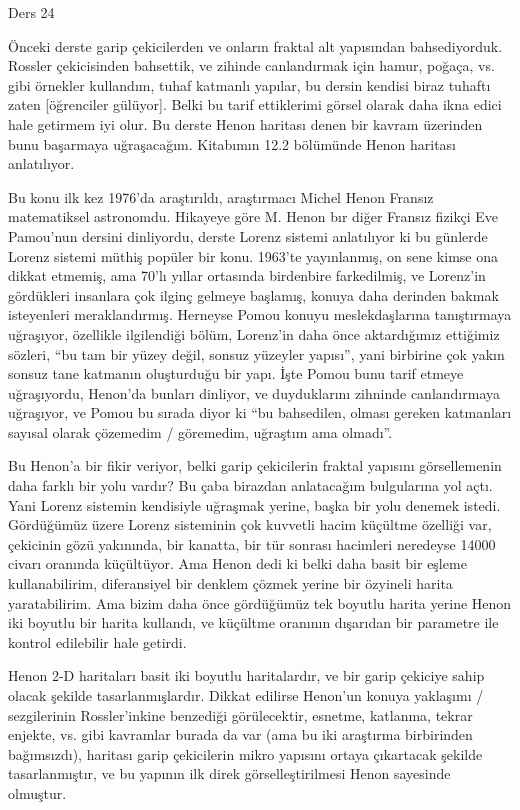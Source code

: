 \documentclass[12pt,fleqn]{article}\usepackage{../../common}
\begin{document}
Ders 24

Önceki derste garip çekicilerden ve onların fraktal alt yapısından
bahsediyorduk. Rossler çekicisinden bahsettik, ve zihinde canlandırmak için
hamur, poğaça, vs. gibi örnekler kullandım, tuhaf katmanlı yapılar, bu
dersin kendisi biraz tuhaftı zaten [öğrenciler gülüyor]. Belki bu tarif
ettiklerimi görsel olarak daha ikna edici hale getirmem iyi olur. Bu derste
Henon haritası denen bir kavram üzerinden bunu başarmaya
uğraşacağım. Kitabımın 12.2 bölümünde Henon haritası anlatılıyor.

Bu konu ilk kez 1976'da araştırıldı, araştırmacı Michel Henon Fransız
matematiksel astronomdu. Hikayeye göre M. Henon bır diğer Fransız fizikçi
Eve Pamou'nun dersini dinliyordu, derste Lorenz sistemi anlatılıyor ki bu
günlerde Lorenz sistemi müthiş popüler bir konu. 1963'te yayınlanmış, on
sene kimse ona dikkat etmemiş, ama 70'lı yıllar ortasında birdenbire
farkedilmiş, ve Lorenz'in gördükleri insanlara çok ilginç gelmeye başlamış,
konuya daha derinden bakmak isteyenleri meraklandırmış. Herneyse Pomou
konuyu meslekdaşlarına tanıştırmaya uğraşıyor, özellikle ilgilendiği bölüm,
Lorenz'in daha önce aktardığımız ettiğimiz sözleri, ``bu tam bir yüzey
değil, sonsuz yüzeyler yapısı'', yani birbirine çok yakın sonsuz tane
katmanın oluşturduğu bir yapı. İşte Pomou bunu tarif etmeye uğraşıyordu,
Henon'da bunları dinliyor, ve duyduklarını zihninde canlandırmaya
uğraşıyor, ve Pomou bu sırada diyor ki ``bu bahsedilen, olması gereken
katmanları sayısal olarak çözemedim / göremedim, uğraştım ama olmadı''.

Bu Henon'a bir fikir veriyor, belki garip çekicilerin fraktal yapısını
görsellemenin daha farklı bir yolu vardır? Bu çaba birazdan anlatacağım
bulgularına yol açtı. Yani Lorenz sistemin kendisiyle uğraşmak yerine,
başka bir yolu denemek istedi. Gördüğümüz üzere Lorenz sisteminin çok
kuvvetli hacim küçültme özelliği var, çekicinin gözü yakınında, bir
kanatta, bir tür sonrası hacimleri neredeyse 14000 civarı oranında
küçültüyor. Ama Henon dedi ki belki daha basit bir eşleme kullanabilirim,
diferansiyel bir denklem çözmek yerine bir özyineli harita
yaratabilirim. Ama bizim daha önce gördüğümüz tek boyutlu harita yerine
Henon iki boyutlu bir harita kullandı, ve küçültme oranının dışarıdan bir
parametre ile kontrol edilebilir hale getirdi.

Henon 2-D haritaları basit iki boyutlu haritalardır, ve bir garip çekiciye
sahip olacak şekilde tasarlanmışlardır. Dikkat edilirse Henon'un konuya
yaklaşımı / sezgilerinin Rossler'inkine benzediği görülecektir, esnetme,
katlanma, tekrar enjekte, vs. gibi kavramlar burada da var (ama bu iki
araştırma birbirinden bağımsızdı), haritası garip çekicilerin mikro
yapısını ortaya çıkartacak şekilde tasarlanmıştır, ve bu yapının ilk direk
görselleştirilmesi Henon sayesinde olmuştur.
\end{document}
